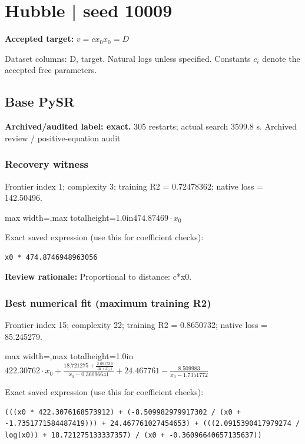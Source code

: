 \documentclass[10pt,letterpaper,landscape]{article}
\begin{document}
\section*{Hubble | seed 10009}
\textbf{Accepted target:} $\displaystyle v=c x_0$\hfill $x_0=D$\par
{\small Dataset columns: D, target. Natural logs unless specified. Constants $c_i$ denote the accepted free parameters.}\par\medskip
\begin{minipage}[t]{0.485\textwidth}
\subsection*{Base PySR}
\textbf{Archived/audited label: exact.} 305 restarts; actual search 3599.8 s.
{\small Archived review / positive-equation audit}
\subsubsection*{Recovery witness}
Frontier index 1; complexity 3; training R2 = 0.72478362; native loss = 142.50496.
\begin{center}\begin{adjustbox}{max width=\linewidth,max totalheight=1.0in}$\displaystyle 474.87469 \cdot x_{0}$\end{adjustbox}\end{center}
{\scriptsize Exact saved expression (use this for coefficient checks):}
\begin{lstlisting}
x0 * 474.8746948963056
\end{lstlisting}
{\small\textbf{Review rationale:} Proportional to distance: c*x0.}
\subsubsection*{Best numerical fit (maximum training R2)}
Frontier index 15; complexity 22; training R2 = 0.8650732; native loss = 85.245279.
\begin{center}\begin{adjustbox}{max width=\linewidth,max totalheight=1.0in}$\displaystyle 422.30762 \cdot x_{0} + \frac{18.721275 + \frac{2.091539}{\ln{\left(x_{0} \right)}}}{x_{0} - 0.36096641} + 24.467761 - \frac{8.509983}{x_{0} - 1.7351772}$\end{adjustbox}\end{center}
{\scriptsize Exact saved expression (use this for coefficient checks):}
\begin{lstlisting}
(((x0 * 422.3076168573912) + (-8.509982979917302 / (x0 + -1.7351771584487419))) + 24.467761027454653) + (((2.0915390417979274 / log(x0)) + 18.721275133337357) / (x0 + -0.36096640657135637))
\end{lstlisting}
\end{minipage}\hfill
\end{document}
